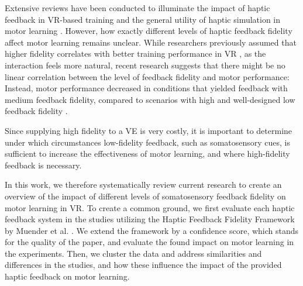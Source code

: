 Extensive reviews have been conducted to illuminate the impact of haptic feedback in VR-based training \cite{Sigrist2013AugmentedReview} and the general utility of haptic simulation in motor learning \cite{Al-Saud2021TheReview}. However, how exactly different levels of haptic feedback fidelity affect motor learning remains unclear.
While researchers previously assumed that higher fidelity correlates with better training performance in VR \cite{Caird1996PersistentTraining, Waller1998TheTraining}, as the interaction feels more natural, recent research suggests that there might be no linear correlation between the level of feedback fidelity and motor performance: Instead, motor performance decreased in conditions that yielded feedback with medium feedback fidelity, compared to scenarios with high and well-designed low feedback fidelity \cite{MahdiNabiyouni201520153DUI.}.

Since supplying high fidelity to a VE is very costly, it is important to determine under which circumstances low-fidelity feedback, such as somatosensory cues, is sufficient to increase the effectiveness of motor learning, and where high-fidelity feedback is necessary. 

In this work, we therefore systematically review current research to create an overview of the impact of different levels of somatosensory feedback fidelity on motor learning in VR. To create a common ground, we first evaluate each haptic feedback system in the studies utilizing the Haptic Feedback Fidelity Framework by Muender et al. \cite{Muender2022HapticReality}. We extend the framework by a confidence score, which stands for the quality of the paper, and evaluate the found impact on motor learning in the experiments. Then, we cluster the data and address similarities and differences in the studies, and how these influence the impact of the provided haptic feedback on motor learning. 
